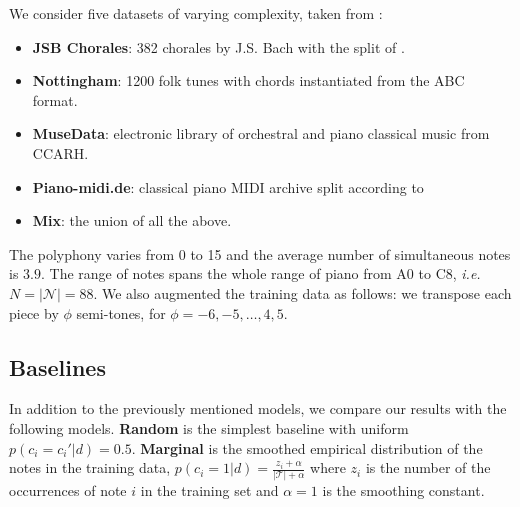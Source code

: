 \documentclass{article}
\newcommand{\N}{\mathcal{N}}
\newcommand{\T}{\mathcal{T}}
\newcommand{\ie}{\textit{i.e.}}
\begin{document}
We consider five datasets of varying complexity, taken from \cite{bl}:
\begin{itemize}
  \item \textbf{JSB Chorales}: 382 chorales by J.S. Bach with the split of  \citet{allan2005harmonising}.
 \item \textbf{Nottingham}: 1200 folk tunes with chords instantiated from the ABC format.
\item \textbf{MuseData}: electronic library of orchestral and piano classical music from CCARH.
\item \textbf{Piano-midi.de}: classical piano MIDI archive split according to \citet{poliner2007discriminative}
\item \textbf{Mix}: the union of all the above.
\end{itemize}
The polyphony varies from 0 to 15 and the average number of simultaneous notes is $3.9$. The range of notes spans the whole range of piano from A0 to C8, \ie\ $N = |\N| = 88$. We also augmented the training data as follows: we transpose each piece by $\phi$ semi-tones, for $\phi = -6, -5, \dots, 4, 5.$
%
\subsection{Baselines}
In addition to the previously mentioned models, we compare our results with the following models. \textbf{Random} is the simplest baseline with uniform $p(c_i = c_i' | d ) = 0.5$. \textbf{Marginal} is the smoothed empirical distribution of the notes in the training data, $p(c_i = 1 | d )= \frac{z_i + \alpha}{|\T|+\alpha}$ where $z_i$ is the number of the occurrences of note $i$ in the training set and $\alpha = 1$ is the smoothing constant.
%
\end{document}
